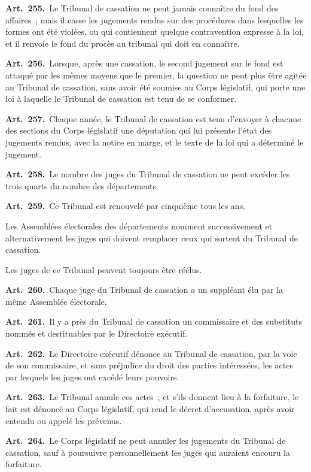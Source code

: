 \documentclass[french,twoside]{book} %
\newcommand{\labelchar}[1]{\textbf{\color{rubric} #1}}
\begin{document}
\labelchar{Art. 255.} Le Tribunal de cassation ne peut jamais connaître du fond des affaires ; mais il casse les jugements rendus sur des procédures dans lesquelles les formes ont été violées, ou qui contiennent quelque contravention expresse à la loi, et il renvoie le fond du procès au tribunal qui doit en connaître.\par
\labelchar{Art. 256.} Lorsque, après une cassation, le second jugement sur le fond est attaqué par les mêmes moyens que le premier, la question ne peut plus être agitée au Tribunal de cassation, sans avoir été soumise au Corps législatif, qui porte une loi à laquelle le Tribunal de cassation est tenu de se conformer.\par
\labelchar{Art. 257.} Chaque année, le Tribunal de cassation est tenu d’envoyer à chacune des sections du Corps législatif une députation qui lui présente l’état des jugements rendus, avec la notice en marge, et le texte de la loi qui a déterminé le jugement.\par
\labelchar{Art. 258.} Le nombre des juges du Tribunal de cassation ne peut excéder les trois quarts du nombre des départements.\par
\labelchar{Art. 259.} Ce Tribunal est renouvelé par cinquième tous les ans.\par
Les Assemblées électorales des départements nomment successivement et alternativement les juges qui doivent remplacer ceux qui sortent du Tribunal de cassation.\par
Les juges de ce Tribunal peuvent toujours être réélus.\par
\labelchar{Art. 260.} Chaque juge du Tribunal de cassation a un suppléant élu par la même Assemblée électorale.\par
\labelchar{Art. 261.} Il y a près du Tribunal de cassation un commissaire et des substituts nommés et destituables par le Directoire exécutif.\par
\labelchar{Art. 262.} Le Directoire exécutif dénonce au Tribunal de cassation, par la voie de son commissaire, et sans préjudice du droit des parties intéressées, les actes par lesquels les juges ont excédé leurs pouvoirs.\par
\labelchar{Art. 263.} Le Tribunal annule ces actes ; et s’ils donnent lieu à la forfaiture, le fait est dénoncé au Corps législatif, qui rend le décret d’accusation, après avoir entendu ou appelé les prévenus.\par
\labelchar{Art. 264.} Le Corps législatif ne peut annuler les jugements du Tribunal de cassation, sauf à poursuivre personnellement les juges qui auraient encouru la forfaiture.
\end{document}
